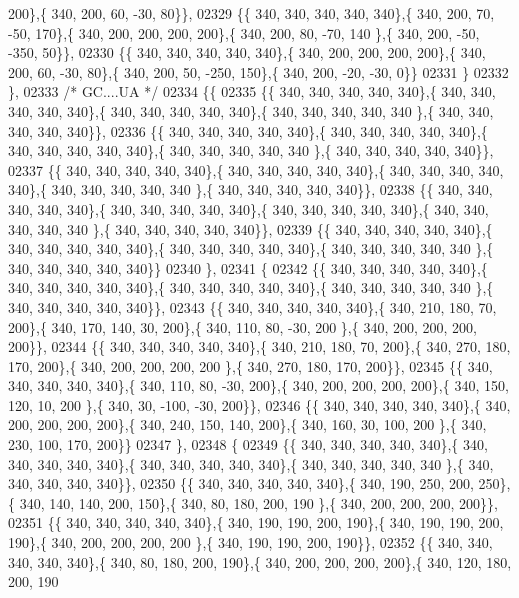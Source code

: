 \begin{DoxyCode}
      200\},\{ 340, 200,  60, -30,  80\}\},
02329 \{\{ 340, 340, 340, 340, 340\},\{ 340, 200,  70, -50, 170\},\{ 340, 200, 200, 200, 200\},\{ 340, 200,  80, -70, 140
      \},\{ 340, 200, -50, -350,  50\}\},
02330 \{\{ 340, 340, 340, 340, 340\},\{ 340, 200, 200, 200, 200\},\{ 340, 200,  60, -30,  80\},\{ 340, 200,  50, -250, 
      150\},\{ 340, 200, -20, -30,   0\}\}
02331 \}
02332 \},
02333 \textcolor{comment}{/* GC....UA */}
02334 \{\{
02335 \{\{ 340, 340, 340, 340, 340\},\{ 340, 340, 340, 340, 340\},\{ 340, 340, 340, 340, 340\},\{ 340, 340, 340, 340, 340
      \},\{ 340, 340, 340, 340, 340\}\},
02336 \{\{ 340, 340, 340, 340, 340\},\{ 340, 340, 340, 340, 340\},\{ 340, 340, 340, 340, 340\},\{ 340, 340, 340, 340, 340
      \},\{ 340, 340, 340, 340, 340\}\},
02337 \{\{ 340, 340, 340, 340, 340\},\{ 340, 340, 340, 340, 340\},\{ 340, 340, 340, 340, 340\},\{ 340, 340, 340, 340, 340
      \},\{ 340, 340, 340, 340, 340\}\},
02338 \{\{ 340, 340, 340, 340, 340\},\{ 340, 340, 340, 340, 340\},\{ 340, 340, 340, 340, 340\},\{ 340, 340, 340, 340, 340
      \},\{ 340, 340, 340, 340, 340\}\},
02339 \{\{ 340, 340, 340, 340, 340\},\{ 340, 340, 340, 340, 340\},\{ 340, 340, 340, 340, 340\},\{ 340, 340, 340, 340, 340
      \},\{ 340, 340, 340, 340, 340\}\}
02340 \},
02341 \{
02342 \{\{ 340, 340, 340, 340, 340\},\{ 340, 340, 340, 340, 340\},\{ 340, 340, 340, 340, 340\},\{ 340, 340, 340, 340, 340
      \},\{ 340, 340, 340, 340, 340\}\},
02343 \{\{ 340, 340, 340, 340, 340\},\{ 340, 210, 180,  70, 200\},\{ 340, 170, 140,  30, 200\},\{ 340, 110,  80, -30, 200
      \},\{ 340, 200, 200, 200, 200\}\},
02344 \{\{ 340, 340, 340, 340, 340\},\{ 340, 210, 180,  70, 200\},\{ 340, 270, 180, 170, 200\},\{ 340, 200, 200, 200, 200
      \},\{ 340, 270, 180, 170, 200\}\},
02345 \{\{ 340, 340, 340, 340, 340\},\{ 340, 110,  80, -30, 200\},\{ 340, 200, 200, 200, 200\},\{ 340, 150, 120,  10, 200
      \},\{ 340,  30, -100, -30, 200\}\},
02346 \{\{ 340, 340, 340, 340, 340\},\{ 340, 200, 200, 200, 200\},\{ 340, 240, 150, 140, 200\},\{ 340, 160,  30, 100, 200
      \},\{ 340, 230, 100, 170, 200\}\}
02347 \},
02348 \{
02349 \{\{ 340, 340, 340, 340, 340\},\{ 340, 340, 340, 340, 340\},\{ 340, 340, 340, 340, 340\},\{ 340, 340, 340, 340, 340
      \},\{ 340, 340, 340, 340, 340\}\},
02350 \{\{ 340, 340, 340, 340, 340\},\{ 340, 190, 250, 200, 250\},\{ 340, 140, 140, 200, 150\},\{ 340,  80, 180, 200, 190
      \},\{ 340, 200, 200, 200, 200\}\},
02351 \{\{ 340, 340, 340, 340, 340\},\{ 340, 190, 190, 200, 190\},\{ 340, 190, 190, 200, 190\},\{ 340, 200, 200, 200, 200
      \},\{ 340, 190, 190, 200, 190\}\},
02352 \{\{ 340, 340, 340, 340, 340\},\{ 340,  80, 180, 200, 190\},\{ 340, 200, 200, 200, 200\},\{ 340, 120, 180, 200, 190

\end{DoxyCode}
